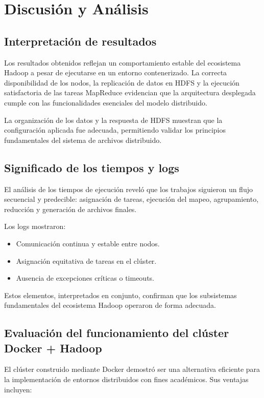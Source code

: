 \section{Discusi\'on y An\'alisis}

\subsection{Interpretaci\'on de resultados}
Los resultados obtenidos reflejan un comportamiento estable del ecosistema Hadoop a pesar de ejecutarse en un entorno contenerizado. La correcta disponibilidad de los nodos, la replicaci\'on de datos en HDFS y la ejecuci\'on satisfactoria de las tareas MapReduce evidencian que la arquitectura desplegada cumple con las funcionalidades esenciales del modelo distribuido.

La organizaci\'on de los datos y la respuesta de HDFS muestran que la configuraci\'on aplicada fue adecuada, permitiendo validar los principios fundamentales del sistema de archivos distribuido.

\subsection{Significado de los tiempos y logs}
El an\'alisis de los tiempos de ejecuci\'on revel\'o que los trabajos siguieron un flujo secuencial y predecible: asignaci\'on de tareas, ejecuci\'on del mapeo, agrupamiento, reducci\'on y generaci\'on de archivos finales.

Los logs mostraron:

\begin{itemize}
    \item Comunicaci\'on continua y estable entre nodos.
    \item Asignaci\'on equitativa de tareas en el cl\'uster.
    \item Ausencia de excepciones cr\'iticas o timeouts.
\end{itemize}

Estos elementos, interpretados en conjunto, confirman que los subsistemas fundamentales del ecosistema Hadoop operaron de forma adecuada.

\subsection{Evaluaci\'on del funcionamiento del cl\'uster Docker + Hadoop}
El cl\'uster construido mediante Docker demostr\'o ser una alternativa eficiente para la implementaci\'on de entornos distribuidos con fines acad\'emicos. Sus ventajas incluyen:

